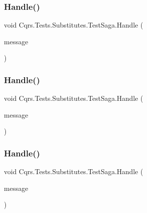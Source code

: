 \subsubsection{\texorpdfstring{Handle()}{Handle()}\hspace{0.1cm}{\footnotesize\ttfamily [1/3]}}
{\footnotesize\ttfamily void Cqrs.\+Tests.\+Substitutes.\+Test\+Saga.\+Handle (\begin{DoxyParamCaption}\item[{\hyperlink{classCqrs_1_1Tests_1_1Substitutes_1_1TestAggregateDidSomething}{Test\+Aggregate\+Did\+Something}}]{message }\end{DoxyParamCaption})}

\mbox{\label{classCqrs_1_1Tests_1_1Substitutes_1_1TestSaga_a25e222765c57e5dad8af26dfbeed9531}} 
\subsubsection{\texorpdfstring{Handle()}{Handle()}\hspace{0.1cm}{\footnotesize\ttfamily [2/3]}}
{\footnotesize\ttfamily void Cqrs.\+Tests.\+Substitutes.\+Test\+Saga.\+Handle (\begin{DoxyParamCaption}\item[{\hyperlink{classCqrs_1_1Tests_1_1Substitutes_1_1TestAggregateDidSomethingElse}{Test\+Aggregate\+Did\+Something\+Else}}]{message }\end{DoxyParamCaption})}

\mbox{\label{classCqrs_1_1Tests_1_1Substitutes_1_1TestSaga_a5dd814be4b049bafa2e2b516a34e7045}} 
\subsubsection{\texorpdfstring{Handle()}{Handle()}\hspace{0.1cm}{\footnotesize\ttfamily [3/3]}}
{\footnotesize\ttfamily void Cqrs.\+Tests.\+Substitutes.\+Test\+Saga.\+Handle (\begin{DoxyParamCaption}\item[{\hyperlink{classCqrs_1_1Tests_1_1Substitutes_1_1TestAggregateDidSomethingElse2}{Test\+Aggregate\+Did\+Something\+Else2}}]{message }\end{DoxyParamCaption})}



